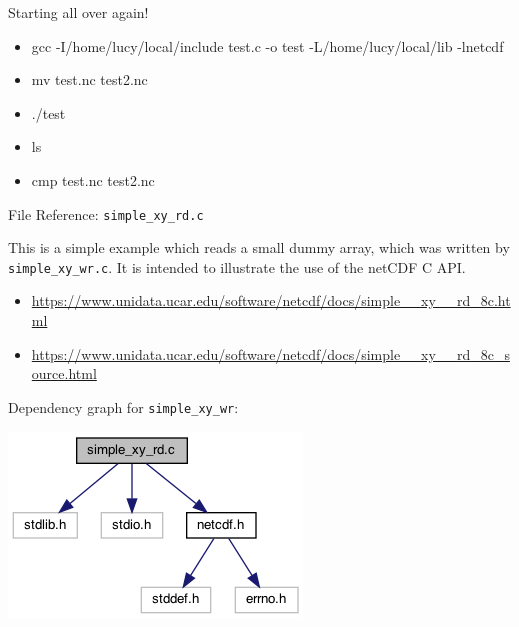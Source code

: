 \documentclass[compress,11pt,xcolor=svgnames,aspectratio=169]{beamer}
\begin{document}
\begin{frame}[fragile]{Starting all over again!}

\begin{itemize}

  \item gcc -I/home/lucy/local/include test.c -o test -L/home/lucy/local/lib -lnetcdf
  \item mv test.nc test2.nc
  \item ./test 
  \item ls
  \item cmp test.nc test2.nc

\end{itemize}

\end{frame}

\begin{frame}[fragile]{File Reference: \texttt{simple\_xy\_rd.c}}

This is a simple example which reads a small dummy array, which was written by \verb|simple_xy_wr.c|. It is intended to illustrate the use of the netCDF C API.\\[0.3cm]

\begin{itemize}
  \item \footnotesize{\url{https://www.unidata.ucar.edu/software/netcdf/docs/simple__xy__rd_8c.html}}\\[0.3cm]
  \item \footnotesize{\url{https://www.unidata.ucar.edu/software/netcdf/docs/simple__xy__rd_8c_source.html}}\\[0.4cm]
\end{itemize}

Dependency graph for \verb|simple_xy_wr|:

\begin{center}
\includegraphics[scale=0.5]{fig/simple__xy__rd_8c__incl}
\end{center}

\end{frame}
\end{document}
